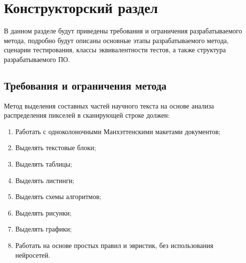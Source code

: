\section{Конструкторский раздел}

В данном разделе будут приведены требования и ограничения разрабатываемого метода, подробно будут описаны основные этапы разрабатываемого метода, сценарии тестирования, классы эквивалентности тестов, а также структура разрабатываемого ПО.



\subsection{Требования и ограничения метода}

Метод выделения составных частей научного текста на основе анализа распределения пикселей в сканирующей строке должен:
\begin{enumerate}
    \item Работать с одноколоночными Манхэттенскими макетами документов;
    \item Выделять текстовые блоки;
    \item Выделять таблицы;
    \item Выделять листинги;
    \item Выделять схемы алгоритмов;
    \item Выделять рисунки;
    \item Выделять графики;
    \item Работать на основе простых правил и эвристик, без использования нейросетей.
\end{enumerate}


